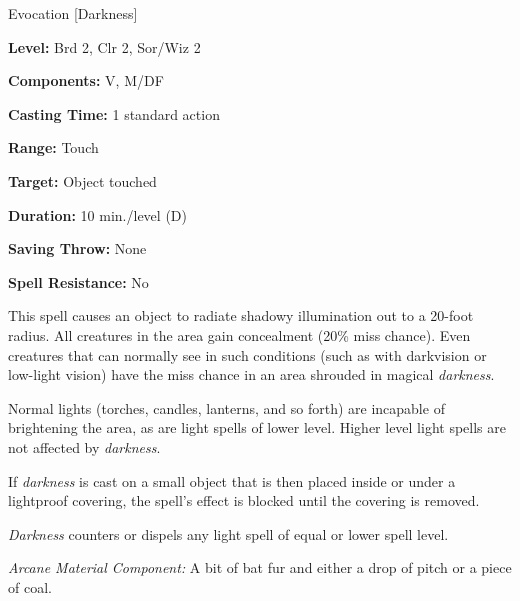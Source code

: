 
Evocation [Darkness]

\textbf{Level:} Brd 2, Clr 2, Sor/Wiz 2

\textbf{Components:} V, M/DF

\textbf{Casting Time:} 1 standard action

\textbf{Range:} Touch

\textbf{Target:} Object touched

\textbf{Duration:} 10 min./level (D)

\textbf{Saving Throw:} None

\textbf{Spell Resistance:} No

This spell causes an object to radiate shadowy illumination out to a 20-foot radius. 
All creatures in the area gain concealment (20\% miss chance). Even creatures that 
can normally see in such conditions (such as with darkvision or low-light vision) 
have the miss chance in an area shrouded in magical \textit{darkness}.

Normal lights (torches, candles, lanterns, and so forth) are incapable of brightening 
the area, as are light spells of lower level. Higher level light spells are not 
affected by \textit{darkness}.

If \textit{darkness} is cast on a small object that is then placed inside or under 
a lightproof covering, the spell's effect is blocked until the covering is removed.

\textit{Darkness} counters or dispels any light spell of equal or lower spell level.

\textit{Arcane Material Component:} A bit of bat fur and either a drop of pitch 
or a piece of coal.

